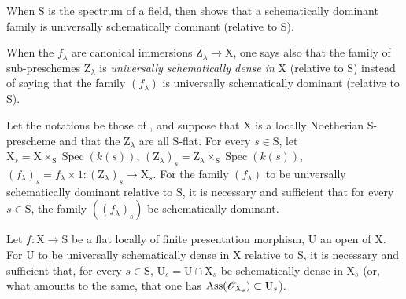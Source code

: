When $\mathrm{S}$ is the spectrum of a field,  then shows that a schematically dominant family is universally schematically dominant (relative to $\mathrm{S}$).

When the $f_\lambda$ are canonical immersions $\mathrm{Z}_\lambda\to\mathrm{X}$, one says also that the family of sub-preschemes $\mathrm{Z}_\lambda$ is \emph{universally schematically dense in} $\mathrm{X}$ (relative to $\mathrm{S}$) instead of saying that the family $(f_\lambda)$ is universally schematically dominant (relative to $\mathrm{S}$).

\begin{theorem}[11.10.9]
\label{IV.11.10.9}
Let the notations be those of , and suppose that $\mathrm{X}$ is a locally Noetherian $\mathrm{S}$-prescheme and that the $\mathrm{Z}_\lambda$ are all $\mathrm{S}$-flat.
For every $s\in\mathrm{S}$, let $\mathrm{X}_s=\mathrm{X}\times_\mathrm{S}\operatorname{Spec}(k(s))$, $(\mathrm{Z}_\lambda)_s=\mathrm{Z}_\lambda\times_\mathrm{S}\operatorname{Spec}(k(s))$, $(f_\lambda)_s=f_\lambda\times 1:(\mathrm{Z}_\lambda)_s\to\mathrm{X}_s$.
For the family $(f_\lambda)$ to be universally schematically dominant relative to $\mathrm{S}$, it is necessary and sufficient that for every $s\in\mathrm{S}$, the family $((f_\lambda)_s)$ be schematically dominant.
\end{theorem}

\begin{proposition}[11.10.10]
\label{IV.11.10.10}
Let $f:\mathrm{X}\to\mathrm{S}$ be a flat locally of finite presentation morphism, $\mathrm{U}$ an open of $\mathrm{X}$.
For $\mathrm{U}$ to be universally schematically dense in $\mathrm{X}$ relative to $\mathrm{S}$, it is necessary and sufficient that, for every $s\in\mathrm{S}$, $\mathrm{U}_s=\mathrm{U}\cap\mathrm{X}_s$ be schematically dense in $\mathrm{X}_s$ (or, what amounts to the same, that one has $\operatorname{Ass}(\mathscr{O}_{\mathrm{X}_s})\subset\mathrm{U}_s$).
\end{proposition}
